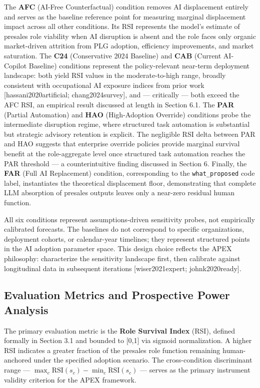 \documentclass[10pt, conference]{IEEEtran}
\begin{document}
The \textbf{AFC} (AI-Free Counterfactual) condition removes AI displacement entirely and serves as the baseline reference point for measuring marginal displacement impact across all other conditions. Its RSI represents the model's estimate of presales role viability when AI disruption is absent and the role faces only organic market-driven attrition from PLG adoption, efficiency improvements, and market saturation. The \textbf{C24} (Conservative 2024 Baseline) and \textbf{CAB} (Current AI-Copilot Baseline) conditions represent the policy-relevant near-term deployment landscape: both yield RSI values in the moderate-to-high range, broadly consistent with occupational AI exposure indices from prior work [hassani2020artificial; chang2024survey], and --- critically --- both exceed the AFC RSI, an empirical result discussed at length in Section 6.1. The \textbf{PAR} (Partial Automation) and \textbf{HAO} (High-Adoption Override) conditions probe the intermediate disruption regime, where structured task automation is substantial but strategic advisory retention is explicit. The negligible RSI delta between PAR and HAO suggests that enterprise override policies provide marginal survival benefit at the role-aggregate level once structured task automation reaches the PAR threshold --- a counterintuitive finding discussed in Section 6. Finally, the \textbf{FAR} (Full AI Replacement) condition, corresponding to the \texttt{what\_proposed} code label, instantiates the theoretical displacement floor, demonstrating that complete LLM absorption of presales outputs leaves only a near-zero residual human function.

All six conditions represent assumptions-driven sensitivity probes, not empirically calibrated forecasts. The baselines do not correspond to specific organizations, deployment cohorts, or calendar-year timelines; they represent structured points in the AI adoption parameter space. This design choice reflects the APEX philosophy: characterize the sensitivity landscape first, then calibrate against longitudinal data in subsequent iterations [wiser2021expert; johnk2020ready].

\subsection{Evaluation Metrics and Prospective Power Analysis}

\label{sec:evaluation_metrics_and_prospective_power}

The primary evaluation metric is the \textbf{Role Survival Index} (RSI), defined formally in Section 3.1 and bounded to [0,1] via sigmoid normalization. A higher RSI indicates a greater fraction of the presales role function remaining human-anchored under the specified adoption scenario. The cross-condition discriminant range --- $\max_c \text{RSI}(s_c) - \min_c \text{RSI}(s_c)$ --- serves as the primary instrument validity criterion for the APEX framework.
\end{document}
